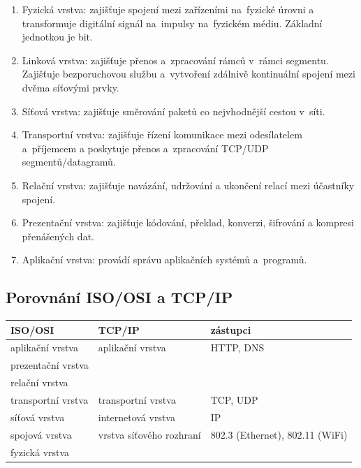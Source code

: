 \begin{enumerate}
    \item
          Fyzická vrstva:
          zajišťuje spojení mezi zařízeními na~fyzické úrovni a transformuje digitální signál na~impulsy na~fyzickém médiu.
          Základní jednotkou je bit.
    \item
          Linková vrstva:
          zajišťuje přenos a~zpracování rámců v~rámci segmentu.
          Zajišťuje bezporuchovou službu a~vytvoření zdálnivě kontinuální spojení mezi dvěma síťovými prvky.
    \item
          Síťová vrstva:
          zajišťuje směrování paketů co nejvhodnější cestou v~síti.
    \item
          Transportní vrstva:
          zajišťuje řízení komunikace mezi odesílatelem a~příjemcem a poskytuje přenos a~zpracování TCP/UDP segmentů/datagramů.
    \item
          Relační vrstva:
          zajišťuje navázání, udržování a ukončení relací mezi účastníky spojení.
    \item
          Prezentační vrstva:
          zajišťuje kódování, překlad, konverzi, šifrování a kompresi přenášených dat.
    \item
          Aplikační vrstva:
          provádí správu aplikačních systémů a~programů.
\end{enumerate}
\FloatBarrier


\subsection{Porovnání ISO/OSI a TCP/IP}

\begin{table}[ht]
    \centering
    \begin{tabular}{lll}
        \textbf{ISO/OSI}   & \textbf{TCP/IP}          & zástupci                        \\
        \hline \hline
        aplikační vrstva   & aplikační vrstva         & HTTP, DNS                       \\
        prezentační vrstva &                          &                                 \\
        relační vrstva     &                          &                                 \\
        \hline
        transportní vrstva & transportní vrstva       & TCP, UDP                        \\
        \hline
        síťová vrstva      & internetová vrstva       & IP                              \\
        \hline
        spojová vrstva     & vrstva síťového rozhraní & 802.3 (Ethernet), 802.11 (WiFi) \\
        fyzická vrstva     &                          &                                 \\
    \end{tabular}
    \label{Srovnání modelů ISO/OSI a TCP/IP}
\end{table}


